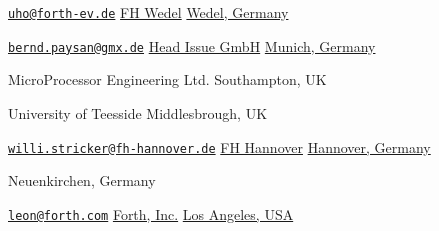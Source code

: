 \cbstart
{}
	{\uline{\texttt{uho@forth-ev.de}}}
	{\uline{FH Wedel}}
	{\uline{Wedel, Germany}}
\cbend

\cbstart
{}
	{\uline{\texttt{bernd.paysan@gmx.de}}}
	{\uline{Head Issue GmbH}}
	{\uline{Munich, Germany}}
\cbend

	{}
	{MicroProcessor Engineering Ltd.}
	{Southampton, UK}

	{}
	{University of Teesside}
	{Middlesbrough, UK}

\cbstart
{}
	{\uline{\texttt{willi.stricker@fh-hannover.de}}}
	{\uline{FH Hannover}}
	{\uline{Hannover, Germany}}
\cbend

	{}
	{}
	{Neuenkirchen, Germany}

\cbstart
{}
	{\uline{\texttt{leon@forth.com}}}
	{\uline{Forth, Inc.}}
	{\uline{Los Angeles, USA}}
\cbend
